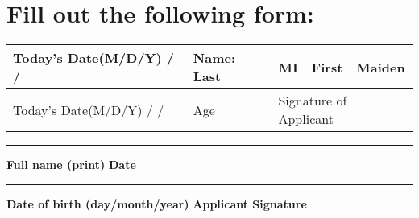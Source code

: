 \documentclass[12pt]{article}
\begin{document}
	
%	 
	
	\pagestyle{empty}
	
	
	\section*{Fill out the following form:}
	
	\begin{framed}
		\begin{tabularx}{\linewidth}{|p{4cm}|X|X|X|p{0.75cm}|X|X|}
			\hline
			Today's Date(M/D/Y)\linebreak
			\hspace*{0.5cm}/\hspace*{0.5cm} / &
			\multicolumn{3}{p{4cm}|}{Name: Last} & MI & First & Maiden \\
			\hline
			Today's Date(M/D/Y)\linebreak
			\hspace*{0.5cm}/\hspace{0.5cm} / & Age &
			\multicolumn{5}{p{10cm}|}{Signature of Applicant} \\
			\hline
		\end{tabularx}
	\end{framed}


	\begin{framed}
		\vspace{0.5cm}
		\hrule
		\vspace{0.5cm}
		\textbf{Full name (print)} \hspace{7cm} \textbf{Date}
		
		\vspace{0.5cm}
		\hrule
		\vspace{0.5cm}
		\textbf{Date of birth (day/month/year)} \hspace{4cm} \textbf{Applicant Signature} 
		\vspace{0.25cm}
		
	\end{framed}
\end{document}
